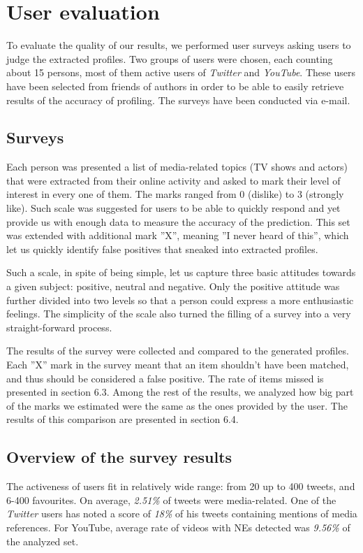 \section{User evaluation}
\label{sec:evaluation}

To evaluate the quality of our results, we performed user surveys
asking users to judge the extracted profiles. Two groups of users were chosen,
each counting about 15 persons, most of them active users of \textit{Twitter} and \textit{YouTube}.
These users have been selected from friends of authors in order to be able to easily
retrieve results of the accuracy of profiling. The surveys have been conducted via
e-mail.

\subsection{Surveys}

Each person was presented a list of media-related topics (TV shows and actors) 
that were extracted from their online
activity and asked to mark their level of interest in every one of
them. The marks ranged from 0 (dislike) to 3 (strongly like).
Such scale was suggested for users to be able to quickly respond
and yet provide us with enough data to measure the accuracy of the prediction.
This set was extended with additional mark ''X'', meaning
''I never heard of this'', which let us quickly identify false positives that
sneaked into extracted profiles.

Such a scale, in spite of being simple, let us capture three basic attitudes
towards a given subject: positive, neutral and negative. Only the positive
attitude was further divided into two levels so that a person could express a
more enthusiastic feelings. The simplicity of the scale also turned the filling
of a survey into a very straight-forward process.

The results of the survey were collected and compared to the generated profiles.
Each ''X'' mark in the survey meant that an item shouldn't have been matched,
and thus should be considered a false positive. The rate of items missed is
presented in section 6.3. Among the rest of the results, we analyzed how big
part of the marks we estimated were the same as the ones provided by the user.
The results of this comparison are presented in section 6.4.

\subsection{Overview of the survey results}
The activeness of users fit in relatively wide range: from 20 up to 400 tweets,
and 6-400 favourites. On average, \textit{2.51\%} of tweets were media-related.
One of the \textit{Twitter} users has noted a score of \textit{18\%} of his
tweets containing mentions of media references. For YouTube, average rate of
videos with NEs detected was \textit{9.56\%} of the analyzed set.

